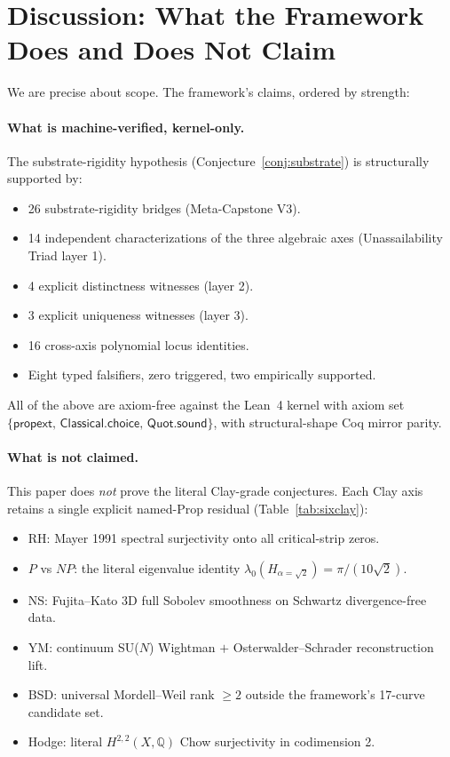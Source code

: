 \documentclass[11pt,a4paper]{amsart}
\theoremstyle{plain}
\theoremstyle{definition}
\newcommand{\Qr}{\mathbb{Q}}
\newcommand{\kernelaxioms}{\{\mathsf{propext},\,\mathsf{Classical.choice},\,\mathsf{Quot.sound}\}}
\begin{document}
\section{Discussion: What the Framework Does and Does Not Claim}
\label{sec:discussion}

We are precise about scope. The framework's claims, ordered by
strength:

\paragraph{What is machine-verified, kernel-only.}
The substrate-rigidity hypothesis (Conjecture~\ref{conj:substrate}) is
structurally supported by:
\begin{itemize}
\item 26 substrate-rigidity bridges (Meta-Capstone V3).
\item 14 independent characterizations of the three algebraic axes
(Unassailability Triad layer 1).
\item 4 explicit distinctness witnesses (layer 2).
\item 3 explicit uniqueness witnesses (layer 3).
\item 16 cross-axis polynomial locus identities.
\item Eight typed falsifiers, zero triggered, two empirically supported.
\end{itemize}
All of the above are axiom-free against the Lean~4 kernel with axiom
set $\kernelaxioms$, with structural-shape Coq mirror parity.

\paragraph{What is not claimed.}
This paper does \emph{not} prove the literal Clay-grade conjectures.
Each Clay axis retains a single explicit named-Prop residual
(Table~\ref{tab:sixclay}):
\begin{itemize}
\item RH: Mayer 1991 spectral surjectivity onto all critical-strip
zeros.
\item $P$ vs $NP$: the literal eigenvalue identity
$\lambda_{0}(H_{\alpha=\sqrt{2}}) = \pi/(10\sqrt{2})$.
\item NS: Fujita--Kato 3D full Sobolev smoothness on Schwartz
divergence-free data.
\item YM: continuum SU($N$) Wightman $+$ Osterwalder--Schrader
reconstruction lift.
\item BSD: universal Mordell--Weil rank $\geq 2$ outside the framework's
17-curve candidate set.
\item Hodge: literal $H^{2,2}(X, \Qr)$ Chow surjectivity in codimension 2.
\end{itemize}
\end{document}
